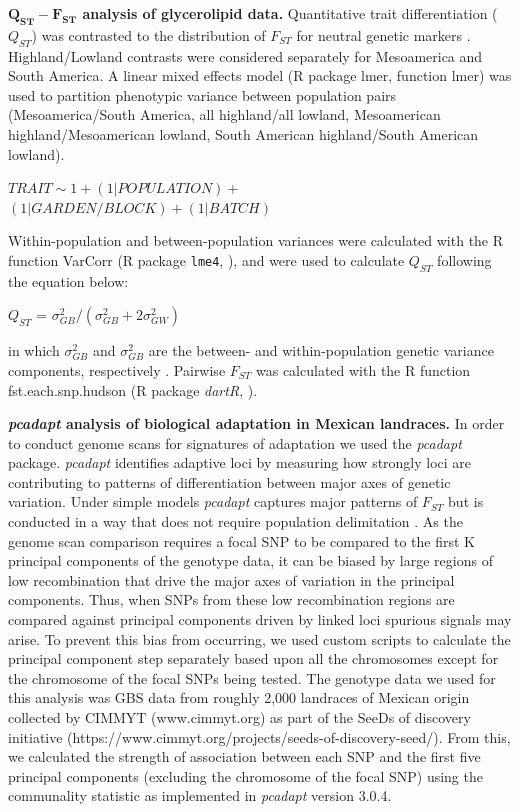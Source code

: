 \documentclass[9pt,twocolumn,twoside,lineno]{biorxiv}
\begin{document}
\textbf{$\mathbf{Q_{ST}-F_{ST}}$ analysis of glycerolipid data.}
Quantitative trait differentiation ($Q_{ST}$) was contrasted to the distribution of $F_{ST}$ for neutral genetic markers \cite{whitlock2008evolutionary}.
Highland/Lowland contrasts were considered separately for Mesoamerica and South America.
A linear mixed effects model (R package lmer, function lmer) was used to partition phenotypic variance between population pairs (Mesoamerica/South America, all highland/all lowland, Mesoamerican highland/Mesoamerican lowland, South American highland/South American lowland).
\begin{center}
${ TRAIT \sim 1 + (1|POPULATION) + }$\\
${(1|GARDEN/BLOCK) + (1|BATCH)}$
\end{center}
Within-population and between-population variances were calculated with the R function VarCorr (R package \texttt{lme4}, \citealp{bates2014lme4}), and were used to calculate $Q_{ST}$ following the equation below:
\begin{center}
$Q_{ST}$ = \(\sigma^{2}_{GB}/(\sigma^{2}_{GB}+2\sigma^{2}_{GW})\)
\end{center}
\noindent in which $\sigma^{2}_{GB}$ and $\sigma^{2}_{GB}$ are the between- and within-population genetic variance components, respectively \cite{Leinonen2013-ic}.
Pairwise $F_{ST}$ was calculated with the R function fst.each.snp.hudson (R package \textit{dartR}, \citealp{gruber2018dartr}).

\textbf{\textit{pcadapt} analysis of biological adaptation in Mexican landraces.}
In order to conduct genome scans for signatures of adaptation we used the \textit{pcadapt} \cite{Luu2017-ws} package.
\textit{pcadapt} identifies adaptive loci by measuring how strongly loci are contributing to patterns of differentiation between major axes of genetic variation.
Under simple models \textit{pcadapt} captures major patterns of $F_{ST}$  but is conducted in a way that does not require population delimitation \cite{duforet2014genome}.
As the genome scan comparison requires a focal SNP to be compared to the first K principal components of the genotype data, it can be biased by large regions of low recombination that drive the major axes of variation in the principal components.
Thus, when SNPs from these low recombination regions are compared against principal components driven by linked loci spurious signals may arise.
To prevent this bias from occurring, we used custom scripts to calculate the principal component step separately based upon all the chromosomes except for the chromosome of the focal SNPs being tested.
The genotype data we used for this analysis was GBS data from roughly 2,000 landraces of Mexican origin collected by CIMMYT (www.cimmyt.org) as part of the SeeDs of discovery initiative (https://www.cimmyt.org/projects/seeds-of-discovery-seed/).
From this, we calculated the strength of association between each SNP and the first five principal components (excluding the chromosome of the focal SNP) using the communality statistic as implemented in \textit{pcadapt} version 3.0.4.
\end{document}
